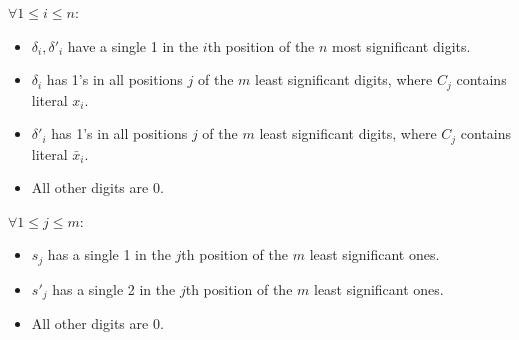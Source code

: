 $\forall1\leq i\leq n$:
\begin{itemize}
\item $\delta_i,\delta'_i$ have a single 1 in the $i$th position of the $n$ most significant digits.
\item $\delta_i$ has 1's in all positions $j$ of the $m$ least significant digits, where $C_j$ contains literal $x_i$.
\item $\delta'_i$ has 1's in all positions $j$ of the $m$ least significant digits, where $C_j$ contains literal $\bar x_i$.
\item All other digits are 0.
\end{itemize}
$\forall1\leq j\leq m$:
\begin{itemize}
\item $s_j$ has a single 1 in the $j$th position of the $m$ least significant ones.
\item $s'_j$ has a single 2 in the $j$th position of the $m$ least significant ones.
\item All other digits are 0.
\end{itemize}
